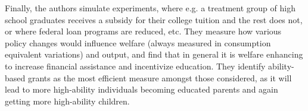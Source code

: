 \documentclass[12pt,a4paper]{article}
\begin{document}
Finally, the authors simulate experiments, where e.g. a treatment group of high school graduates receives a subsidy for their college tuition and the rest does not, or where federal loan programs are reduced, etc. They measure how various policy changes would influence welfare (always measured in consumption equivalent variations) and output, and find that in general it is welfare enhancing to increase financial assistance and incentivize education. They identify ability-based grants as the most efficient measure amongst those considered, as it will lead to more high-ability individuals becoming educated parents and again getting more high-ability children. 

\pagebreak



\pagebreak
\end{document}
